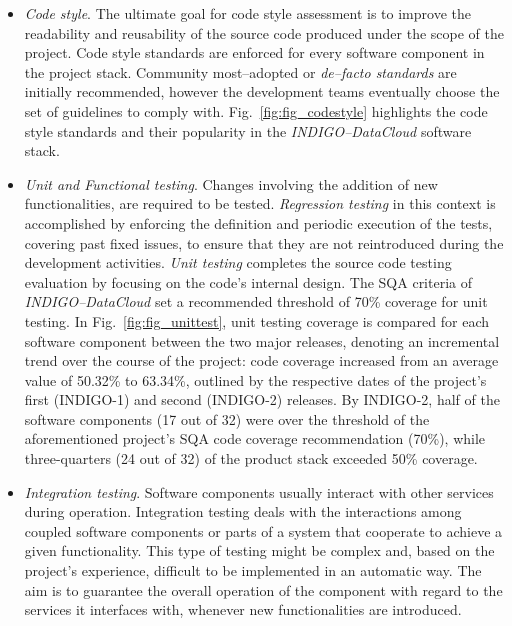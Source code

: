 \documentclass[journal]{IEEEtran}
\begin{document}
\begin{itemize}
\item \textit{Code style}.
The ultimate goal for code style assessment is to improve the readability and reusability of the source code produced under the scope of the
project. Code style standards are enforced for every software component in the project stack. Community
most--adopted or \textit{de--facto standards} are initially recommended, however the development teams eventually
choose the set of guidelines to comply with. Fig.~\ref{fig:fig_codestyle} highlights the code style standards and
their popularity
in the {\sl INDIGO--DataCloud} software stack.

\item \textit{Unit and Functional testing}.
Changes involving the addition of new functionalities, are required to be tested. \textit{Regression
testing} in this context is accomplished by enforcing the definition and periodic execution
of the tests, covering past fixed issues, to ensure that they are not reintroduced during the development
activities. \textit{Unit testing} completes the source code testing evaluation by focusing on the code's 
internal design. The SQA criteria of {\sl INDIGO--DataCloud} set a recommended threshold of 70\% coverage 
for unit testing. In Fig.~\ref{fig:fig_unittest}, unit testing coverage is compared for each software 
component between the two major releases, denoting an incremental trend over the course of the project: 
code coverage increased from an average value of 50.32\% to 63.34\%, outlined by the respective dates of
the project's first (INDIGO-1) and second (INDIGO-2) releases. By INDIGO-2, half of the software components
(17 out of 32) were over the threshold of the aforementioned project's SQA code coverage recommendation 
(70\%), while three-quarters (24 out of 32) of the product stack exceeded 50\% coverage.

\item \textit{Integration testing}. Software components usually interact with other services during
operation. Integration testing deals with the interactions among coupled software components or
parts of a system that cooperate to achieve a given functionality. This type of testing might be
complex and, based on the project's experience, difficult to be implemented in an automatic way. The aim is to
guarantee the overall operation of the component with regard to the services it interfaces with,
whenever new functionalities are introduced.


\end{itemize}
\end{document}
